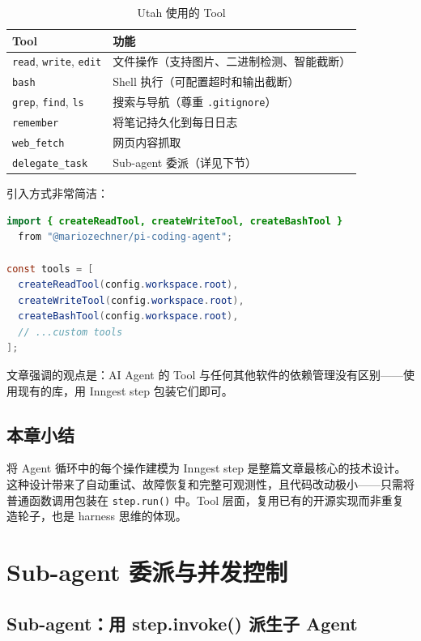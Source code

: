 \documentclass[a4paper]{article}
\begin{document}
\begin{table}[H]
\centering
\caption{Utah 使用的 Tool}
\begin{tabular}{ll}
\toprule
\textbf{Tool} & \textbf{功能} \\
\midrule
\texttt{read}, \texttt{write}, \texttt{edit} & 文件操作（支持图片、二进制检测、智能截断） \\
\texttt{bash} & Shell 执行（可配置超时和输出截断） \\
\texttt{grep}, \texttt{find}, \texttt{ls} & 搜索与导航（尊重 \texttt{.gitignore}） \\
\texttt{remember} & 将笔记持久化到每日日志 \\
\texttt{web\_fetch} & 网页内容抓取 \\
\texttt{delegate\_task} & Sub-agent 委派（详见下节） \\
\bottomrule
\end{tabular}
\end{table}

引入方式非常简洁：

\begin{lstlisting}[caption={Tool 引入示例},language=Java]
import { createReadTool, createWriteTool, createBashTool }
  from "@mariozechner/pi-coding-agent";

const tools = [
  createReadTool(config.workspace.root),
  createWriteTool(config.workspace.root),
  createBashTool(config.workspace.root),
  // ...custom tools
];
\end{lstlisting}

文章强调的观点是：AI Agent 的 Tool 与任何其他软件的依赖管理没有区别——使用现有的库，用 Inngest step 包装它们即可。

\subsection{本章小结}

将 Agent 循环中的每个操作建模为 Inngest step 是整篇文章最核心的技术设计。这种设计带来了自动重试、故障恢复和完整可观测性，且代码改动极小——只需将普通函数调用包装在 \texttt{step.run()} 中。Tool 层面，复用已有的开源实现而非重复造轮子，也是 harness 思维的体现。


\section{Sub-agent 委派与并发控制}

\subsection{Sub-agent：用 step.invoke() 派生子 Agent}
\end{document}
